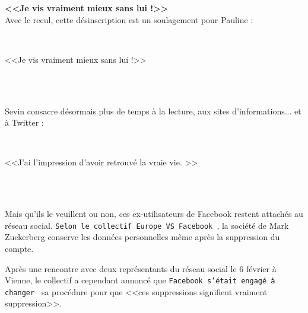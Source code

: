 \documentclass[11pt,twoside,a4paper]{article}
\begin{document}
\textbf{<<Je vis vraiment mieux sans lui !>>}~\\

Avec le recul, cette d{\'e}sinscription est un soulagement pour Pauline : ~\\

\begin{minipage}[h]{0.10\textwidth} ~\\ \end{minipage} \hfill \begin{minipage}[h]{0.70\textwidth}
	<<Je vis vraiment mieux sans lui !>>
\end{minipage} \hfill \begin{minipage}[h]{0.15\textwidth} ~\\ \end{minipage} ~\\ %

Sevin consacre d{\'e}sormais plus de temps {\`a} la lecture, aux sites d'informations... et {\`a} Twitter : ~\\

\begin{minipage}[h]{0.10\textwidth} ~\\ \end{minipage} \hfill \begin{minipage}[h]{0.70\textwidth}
	<<J'ai l'impression d'avoir retrouv{\'e} la vraie vie. >>
\end{minipage} \hfill \begin{minipage}[h]{0.15\textwidth} ~\\ \end{minipage} ~\\ %

Mais qu'ils le veuillent ou non, ces ex-utilisateurs de Facebook restent attach{\'e}s au r{\'e}seau social. \texttt{Selon le collectif Europe VS Facebook~\footnotemark}, la soci{\'e}t{\'e} de Mark Zuckerberg conserve les donn{\'e}es personnelles m{\^e}me apr{\`e}s la suppression du compte. ~\\

Apr{\`e}s une rencontre avec deux repr{\'e}sentants du r{\'e}seau social le 6 f{\'e}vrier {\`a} Vienne, le collectif a cependant annonc{\'e} que \texttt{Facebook s'{\'e}tait engag{\'e} {\`a} changer~\footnotemark} sa proc{\'e}dure pour que <<ces suppressions signifient vraiment suppression>>. ~\\
\end{document}
